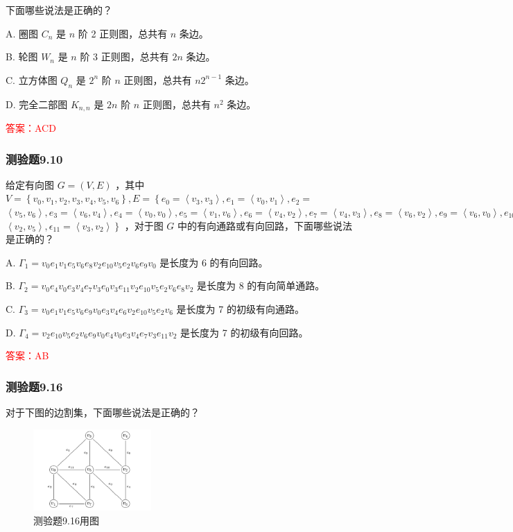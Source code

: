 \documentclass[UTF8, heading=true]{ctexart}
\begin{document}
下面哪些说法是正确的？

A. 圈图 $C_n$ 是 $n$ 阶 2 正则图，总共有 $n$ 条边。

B. 轮图 $W_n$ 是 $n$ 阶 3 正则图，总共有 $2 n$ 条边。

C. 立方体图 $Q_n$ 是 $2^n$ 阶 $n$ 正则图，总共有 $n 2^{n-1}$ 条边。

D. 完全二部图 $K_{n, n}$ 是 $2 n$ 阶 $n$ 正则图，总共有 $n^2$ 条边。

\textcolor{red}{答案：ACD}

\subsubsection{测验题9.10}

给定有向图 $G=(V, E)$ ，其中 $V=\left\{v_0, v_1, v_2, v_3, v_4, v_5, v_6\right\}, E=\left\{e_0=\left\langle v_3, v_3\right\rangle, e_1=\left\langle v_0, v_1\right\rangle, e_2=\right.$ $\left\langle v_5, v_6\right\rangle, e_3=\left\langle v_6, v_4\right\rangle, e_4=\left\langle v_0, v_0\right\rangle, e_5=\left\langle v_1, v_6\right\rangle, e_6=\left\langle v_4, v_2\right\rangle, e_7=\left\langle v_4, v_3\right\rangle, e_8=\left\langle v_6, v_2\right\rangle, e_9=\left\langle v_6, v_0\right\rangle, e_{10}=$ $\left.\left\langle v_2, v_5\right\rangle, \epsilon_{11}=\left\langle v_3, v_2\right\rangle\right\}$ ，对于图 $G$ 中的有向通路或有向回路，下面哪些说法是正确的？

A. $\Gamma_1=v_0 e_1 v_1 e_5 v_6 e_8 v_2 e_{10} v_5 e_2 v_6 e_9 v_0$ 是长度为 6 的有向回路。

B. $\Gamma_2=v_0 e_4 v_0 e_3 v_4 e_7 v_3 e_0 v_3 e_{11} v_2 e_{10} v_5 e_2 v_6 e_8 v_2$ 是长度为 8 的有向简单通路。

C. $\Gamma_3=v_0 e_1 v_1 e_5 v_6 e_9 v_0 e_3 v_4 e_6 v_2 e_{10} v_5 e_2 v_6$ 是长度为 7 的初级有向通路。

D. $\Gamma_4=v_2 e_{10} v_5 e_2 v_6 e_9 v_0 e_4 v_0 e_3 v_4 e_7 v_3 e_{11} v_2$ 是长度为 7 的初级有向回路。

\textcolor{red}{答案：AB}

\subsubsection{测验题9.16}

对于下图的边割集，下面哪些说法是正确的？

\begin{figure}[htbp]
    \centering
    \includegraphics[width=0.4\textwidth]{9.16.png} %
    \caption{测验题9.16用图}
\end{figure}
\end{document}
